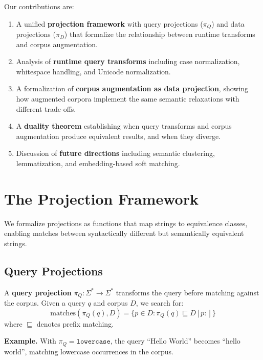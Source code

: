 \documentclass[11pt]{article}
\begin{document}
Our contributions are:

\begin{enumerate}
    \item A unified \textbf{projection framework} with query projections ($\pi_Q$) and data projections ($\pi_D$) that formalize the relationship between runtime transforms and corpus augmentation.

    \item Analysis of \textbf{runtime query transforms} including case normalization, whitespace handling, and Unicode normalization.

    \item A formalization of \textbf{corpus augmentation as data projection}, showing how augmented corpora implement the same semantic relaxations with different trade-offs.

    \item A \textbf{duality theorem} establishing when query transforms and corpus augmentation produce equivalent results, and when they diverge.

    \item Discussion of \textbf{future directions} including semantic clustering, lemmatization, and embedding-based soft matching.
\end{enumerate}

\section{The Projection Framework}

We formalize projections as functions that map strings to equivalence classes, enabling matches between syntactically different but semantically equivalent strings.

\subsection{Query Projections}

A \textbf{query projection} $\pi_Q: \Sigma^* \to \Sigma^*$ transforms the query before matching against the corpus. Given a query $q$ and corpus $D$, we search for:
\begin{equation}
\text{matches}(\pi_Q(q), D) = \{p \in D : \pi_Q(q) \sqsubseteq D[p:]\}
\end{equation}
where $\sqsubseteq$ denotes prefix matching.

\textbf{Example.} With $\pi_Q = \texttt{lowercase}$, the query ``Hello World'' becomes ``hello world'', matching lowercase occurrences in the corpus.
\end{document}
